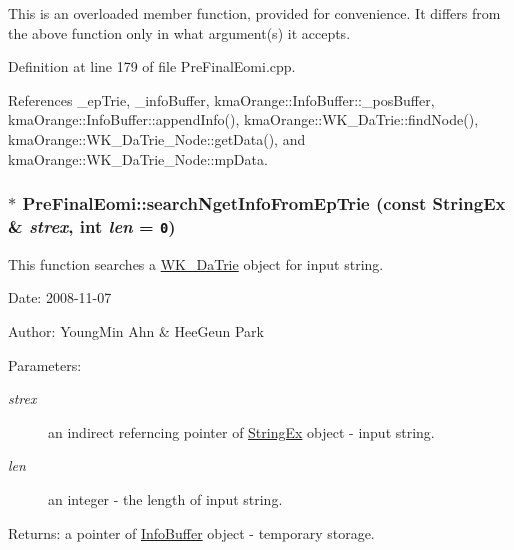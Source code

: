 This is an overloaded member function, provided for convenience. It differs from the above function only in what argument(s) it accepts. 

Definition at line 179 of file PreFinalEomi.cpp.

References \_\-epTrie, \_\-infoBuffer, kmaOrange::InfoBuffer::\_\-posBuffer, kmaOrange::InfoBuffer::appendInfo(), kmaOrange::WK\_\-DaTrie::findNode(), kmaOrange::WK\_\-DaTrie\_\-Node::getData(), and kmaOrange::WK\_\-DaTrie\_\-Node::mpData.\hypertarget{classkmaOrange_1_1PreFinalEomi_500080ebc6f091895b0942cd3e8a3978}{
\subsubsection[{searchNgetInfoFromEpTrie}]{ $\ast$ PreFinalEomi::searchNgetInfoFromEpTrie (const {\bf StringEx} \& {\em strex}, \/  int {\em len} = {\tt 0})}}
\label{classkmaOrange_1_1PreFinalEomi_500080ebc6f091895b0942cd3e8a3978}


This function searches a \hyperlink{classkmaOrange_1_1WK__DaTrie}{WK\_\-DaTrie} object for input string. 

\begin{Desc}
\item[Date:]2008-11-07 \end{Desc}
\begin{Desc}
\item[Author:]YoungMin Ahn \& HeeGeun Park \end{Desc}
\begin{Desc}
\item[Parameters:]
\begin{description}
\item[{\em strex}]an indirect referncing pointer of \hyperlink{classStringEx}{StringEx} object - input string. \item[{\em len}]an integer - the length of input string. \end{description}
\end{Desc}
\begin{Desc}
\item[Returns:]a pointer of \hyperlink{classkmaOrange_1_1InfoBuffer}{InfoBuffer} object - temporary storage. \end{Desc}


